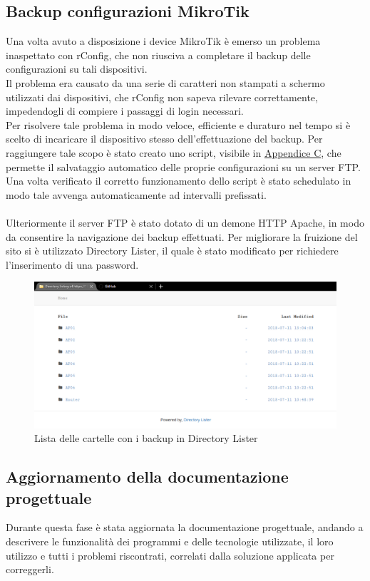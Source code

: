 \documentclass[Realizzazione.tex]{subfiles}
\begin{document}
\subsection{Backup configurazioni MikroTik}
Una volta avuto a disposizione i device MikroTik è emerso un problema inaspettato con rConfig, che non riusciva a completare il backup delle configurazioni su tali dispositivi. \\
Il problema era causato da una serie di caratteri non stampati a schermo utilizzati dai dispositivi, che rConfig non sapeva rilevare correttamente, impedendogli di compiere i passaggi di login necessari. \\
Per risolvere tale problema in modo veloce, efficiente e duraturo nel tempo si è scelto di incaricare il dispositivo stesso dell'effettuazione del backup. Per raggiungere tale scopo è stato creato uno script, visibile in \hyperref[sec:Appendice C]{Appendice C}, che permette il salvataggio automatico delle proprie configurazioni su un server FTP. \\
Una volta verificato il corretto funzionamento dello script è stato schedulato in modo tale avvenga automaticamente ad intervalli prefissati. \\\\
Ulteriormente il server FTP è stato dotato di un demone HTTP Apache, in modo da consentire la navigazione dei backup effettuati. Per migliorare la fruizione del sito si è utilizzato Directory Lister, il quale è stato modificato per richiedere l'inserimento di una password. \\

\begin{figure}[H]
	\centering
	\includegraphics[width=1\linewidth]{"images/DirectoryLister"}
	\caption{Lista delle cartelle con i backup in Directory Lister}
	\label{fig:Lista delle cartelle con i backup in Directory Lister}
\end{figure}


\subsection{Aggiornamento della documentazione progettuale}
Durante questa fase è stata aggiornata la documentazione progettuale, andando a descrivere le funzionalità dei programmi e delle tecnologie utilizzate, il loro utilizzo e tutti i problemi riscontrati, correlati dalla soluzione applicata per correggerli.
	
\end{document}
